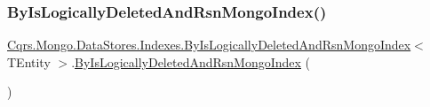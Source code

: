 \subsubsection{\texorpdfstring{By\+Is\+Logically\+Deleted\+And\+Rsn\+Mongo\+Index()}{ByIsLogicallyDeletedAndRsnMongoIndex()}}
{\footnotesize\ttfamily \hyperlink{classCqrs_1_1Mongo_1_1DataStores_1_1Indexes_1_1ByIsLogicallyDeletedAndRsnMongoIndex}{Cqrs.\+Mongo.\+Data\+Stores.\+Indexes.\+By\+Is\+Logically\+Deleted\+And\+Rsn\+Mongo\+Index}$<$ T\+Entity $>$.\hyperlink{classCqrs_1_1Mongo_1_1DataStores_1_1Indexes_1_1ByIsLogicallyDeletedAndRsnMongoIndex}{By\+Is\+Logically\+Deleted\+And\+Rsn\+Mongo\+Index} (\begin{DoxyParamCaption}{ }\end{DoxyParamCaption})\hspace{0.3cm}{\ttfamily [protected]}}

